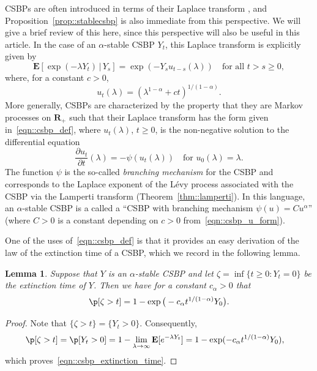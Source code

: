 \documentclass[JEP,XML,SOM,Unicode]{cedram}
\theoremstyle{plain}
\numberwithin{theorem}{section}
\newtheorem{lemma}[theorem]{Lemma}
\theoremstyle{definition}
\newcommand \E {{\mathbf E}}
\newcommand{\R}{\mathbf{R}}
\newcommand{\giv}{\,|\,}
\begin{document}
CSBPs are often introduced in terms of their Laplace transform \cite{legallspatialbranchingbook}, \cite[Chap.\,10]{kyp2006levy_fluctuations} and Proposition~\ref{prop::stablecsbp} is also immediate from this perspective. We will give a brief review of this here, since this perspective will also be useful in this article. In the case of an $\alpha$-stable CSBP $Y_t$, this Laplace transform is explicitly given by
\begin{equation}
\label{eqn::csbp_def}
\E[ \exp(-\lambda Y_t) \giv Y_s ] = \exp(-Y_s u_{t-s}(\lambda)) \quad\text{for all } t > s \geq 0,
\end{equation}
where, for a constant $c > 0$,
\begin{equation}
\label{eqn::csbp_u_form}
u_t(\lambda) = \left( \lambda^{1-\alpha} + c t\right)^{1/(1-\alpha)}.
\end{equation}
More generally, CSBPs are characterized by the property that they are Markov processes on $\R_+$ such that their Laplace transform has the form given in~\eqref{eqn::csbp_def}, where $u_t(\lambda)$, $t \geq 0$, is the non-negative solution to the differential equation
\begin{equation}
\label{eqn::csbp_diffeq}
\frac{\partial u_t}{\partial t}(\lambda) = -\psi(u_t(\lambda))\quad\text{for } u_0(\lambda) = \lambda.
\end{equation}
The function $\psi$ is the so-called \emph{branching mechanism} for the CSBP and corresponds to the Laplace exponent of the Lévy process associated with the CSBP via the Lamperti transform (Theorem~\ref{thm::lamperti}). In this language, an $\alpha$-stable CSBP is a called a ``CSBP with branching mechanism $\psi(u) = C u^\alpha$'' (where $C > 0$ is a constant depending on $c > 0$ from~\eqref{eqn::csbp_u_form}).

One of the uses of~\eqref{eqn::csbp_def} is that it provides an easy derivation of the law of the extinction time of a CSBP, which we record in the following lemma.
\begin{lemma}
\label{lem::csbp_extinction_time}
Suppose that $Y$ is an $\alpha$-stable CSBP and let $\zeta = \inf\{t \geq 0 : Y_t = 0\}$ be the extinction time of $Y$. Then we have for a constant $c_\alpha > 0$ that
\begin{equation}
\label{eqn::csbp_extinction_time}
\p[ \zeta > t] = 1- \exp\big( -c_\alpha t^{1/(1-\alpha)} Y_0 \big).
\end{equation}
\end{lemma}
\begin{proof}
Note that $\{\zeta > t\} = \{ Y_t > 0\}$. Consequently,
\begin{align*}
\p[ \zeta > t]
&= \p[ Y_t > 0 ]
= 1 - \lim_{\lambda \to \infty} \E[ e^{-\lambda Y_t}]
= 1- \exp( - c_\alpha t^{1/(1-\alpha)} Y_0),
\end{align*}
which proves~\eqref{eqn::csbp_extinction_time}.
\end{proof}
\end{document}
